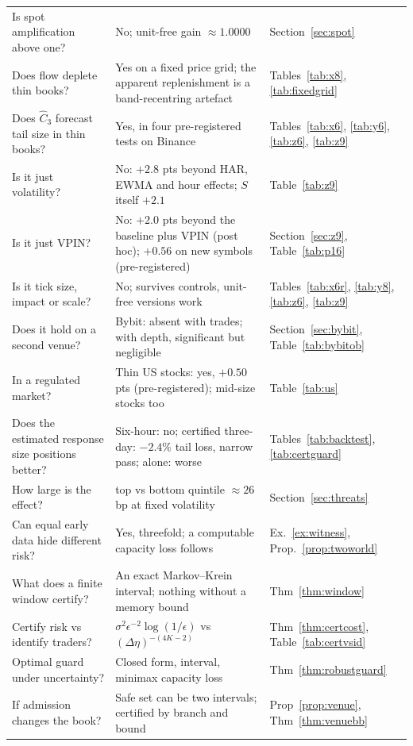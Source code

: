\documentclass[12pt]{article}
\theoremstyle{definition}
\theoremstyle{remark}
\begin{document}
{\begin{longtable}{p{}p{}p{}}
Is spot amplification above one? & No; unit-free gain $\approx1.0000$ & Section~\ref{sec:spot}\\
Does flow deplete thin books? & Yes on a fixed price grid; the apparent replenishment is a band-recentring artefact & Tables~\ref{tab:x8}, \ref{tab:fixedgrid}\\
Does $\hat C_3$ forecast tail size in thin books? & Yes, in four pre-registered tests on Binance & Tables~\ref{tab:x6}, \ref{tab:y6}, \ref{tab:z6}, \ref{tab:z9}\\
Is it just volatility? & No: $+2.8$ pts beyond HAR, EWMA and hour effects; $S$ itself $+2.1$ & Table~\ref{tab:z9}\\
Is it just VPIN? & No: $+2.0$ pts beyond the baseline plus VPIN (post hoc); $+0.56$ on new symbols (pre-registered) & Section~\ref{sec:z9}, Table~\ref{tab:p16}\\
Is it tick size, impact or scale? & No; survives controls, unit-free versions work & Tables~\ref{tab:x6r}, \ref{tab:y8}, \ref{tab:z6}, \ref{tab:z9}\\
Does it hold on a second venue? & Bybit: absent with trades; with depth, significant but negligible & Section~\ref{sec:bybit}, Table~\ref{tab:bybitob}\\
In a regulated market? & Thin US stocks: yes, $+0.50$ pts (pre-registered); mid-size stocks too & Table~\ref{tab:us}\\
Does the estimated response size positions better? & Six-hour: no; certified three-day: $-2.4\%$ tail loss, narrow pass; alone: worse & Tables~\ref{tab:backtest}, \ref{tab:certguard}\\
How large is the effect? & top vs bottom quintile $\approx26$ bp at fixed volatility & Section~\ref{sec:threats}\\
Can equal early data hide different risk? & Yes, threefold; a computable capacity loss follows & Ex.~\ref{ex:witness}, Prop.~\ref{prop:twoworld}\\
What does a finite window certify? & An exact Markov--Krein interval; nothing without a memory bound & Thm~\ref{thm:window}\\
Certify risk vs identify traders? & $\sigma^2\epsilon^{-2}\log(1/\epsilon)$ vs $(\Delta\eta)^{-(4K-2)}$ & Thm~\ref{thm:certcost}, Table~\ref{tab:certvsid}\\
Optimal guard under uncertainty? & Closed form, interval, minimax capacity loss & Thm~\ref{thm:robustguard}\\
If admission changes the book? & Safe set can be two intervals; certified by branch and bound & Prop~\ref{prop:venue}, Thm~\ref{thm:venuebb}\\

\end{longtable}}
\end{document}
